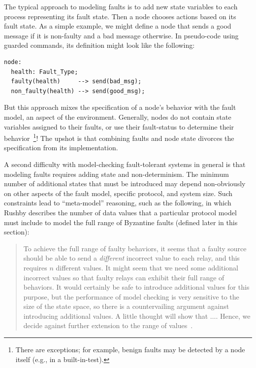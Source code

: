 The typical approach to modeling faults is to add new state variables to each process representing its fault state. Then a node chooses actions based on its fault state. As a simple example, we might define a node that sends a good message if it is non-faulty and a bad message otherwise. In pseudo-code using guarded commands, its definition might look like the following:

\small
\begin{verbatim}
node:
  health: Fault_Type;
  faulty(health)     --> send(bad_msg);
  non_faulty(health) --> send(good_msg);
\end{verbatim}
\normalsize

\noindent
But this approach mixes the specification of a node's behavior with
the fault model, an aspect of the environment. Generally, nodes do
not contain state variables assigned to their faults, or use their
fault-status to determine their behavior~\footnote{There are
exceptions; for example, benign faults may be detected by a node
itself (e.g., in a built-in-test).}! The upshot is that combining
faults and node state divorces the specification from its implementation.

A second difficulty with model-checking fault-tolerant systems in
general is that modeling faults requires adding state and
non-determinism. The minimum number of additional states that must
be introduced may depend non-obviously on other aspects of the fault
model, specific protocol, and system size. Such constraints lead
to ``meta-model'' reasoning, such as the following, in which Rushby
describes the number of data values that a particular protocol model
must include to model the full range of Byzantine faults (defined
later in this section):

\begin{quote} To achieve the full range of faulty behaviors, it
seems that a faulty source should be able to send a \emph{different}
incorrect value to each relay, and this requires $n$ different
values. It might seem that we need some additional incorrect values
so that faulty relays can exhibit their full range of behaviors.
It would certainly be safe to introduce additional values for this
purpose, but the performance of model checking is very sensitive
to the size of the state space, so there is a countervailing argument
against introducing additional values. A little thought will show
that $\ldots$. Hence, we decide against further extension to the
range of values~\cite{Rushby-OM1}. \end{quote}

